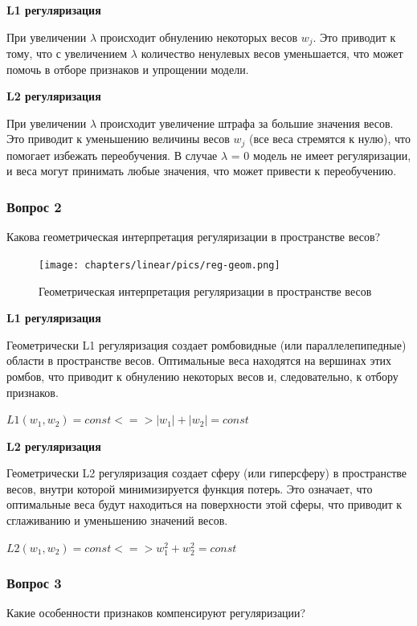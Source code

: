 \textbf{L1 регуляризация}

\noindent При увеличении $\lambda$ происходит обнулению некоторых весов $w_j$. Это приводит к тому, что с увеличением $\lambda$ количество ненулевых весов уменьшается, что может помочь в отборе признаков и упрощении модели.

\textbf{L2 регуляризация}

\noindent При увеличении $\lambda$ происходит увеличение штрафа за большие значения весов. Это приводит к уменьшению величины весов $w_j$ (все веса стремятся к нулю), что помогает избежать переобучения. В случае $\lambda$ = 0 модель не имеет регуляризации, и веса могут принимать любые значения, что может привести к переобучению.

\subsubsection{Вопрос 2}
\noindent Какова геометрическая интерпретация регуляризации в пространстве весов?

\begin{figure}[ht]
	\centering
	\texttt{[image: chapters/linear/pics/reg-geom.png]}
	\caption{Геометрическая интерпретация регуляризации в пространстве весов}
	\label{linear-reg-geom}
\end{figure}

\textbf{L1 регуляризация}

\noindent Геометрически L1 регуляризация создает ромбовидные (или параллелепипедные) области в пространстве весов. Оптимальные веса находятся на вершинах этих ромбов, что приводит к обнулению некоторых весов и, следовательно, к отбору признаков.

$L1(w_1,w_2) = const <=> |w_1|+|w_2| = const$

\textbf{L2 регуляризация}

\noindent Геометрически L2 регуляризация создает сферу (или гиперсферу) в пространстве весов, внутри которой минимизируется функция потерь. Это означает, что оптимальные веса будут находиться на поверхности этой сферы, что приводит к сглаживанию и уменьшению значений весов.

$L2(w_1,w_2) = const <=> w_1^2+w_2^2 = const$

\subsubsection{Вопрос 3}
\noindent Какие особенности признаков компенсируют регуляризации?

